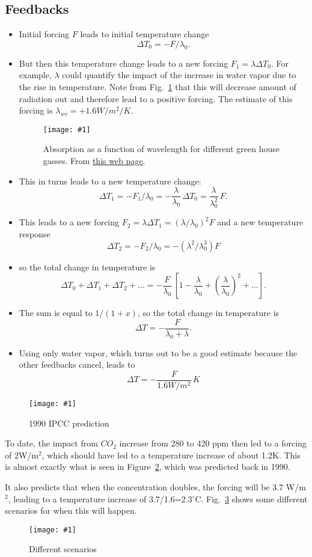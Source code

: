\documentclass[tsecnumarabic,amssymb, nobibnotes, aps, prd]{revtex4-2}
\def\be{\begin{equation}}
\def\ee{\end{equation}}
\newcommand{\sfig}[2]{
\texttt{[image: \#1]}
        }
\newcommand{\Sfig}[2]{
   \begin{figure}[thbp]
   \begin{center}
    \sfig{Figures/#1.pdf}{0.7\columnwidth}
    \caption{{\small #2}}
    \label{fig:#1}
     \end{center}
   \end{figure}
}
\newcommand{\Spng}[2]{
   \begin{figure}[thbp]
   \begin{center}
    \sfig{Figures/#1.png}{0.8\columnwidth}
    \caption{{\small #2}}
    \label{fig:#1}
     \end{center}
   \end{figure}
}
\newcommand{\rf}[1]{\ref{fig:#1}}
\newcommand\bei{\begin{itemize}}
\newcommand\eei{\end{itemize}}
\begin{document}
\subsection{Feedbacks}
\bei
\item Initial forcing $F$ leads to initial temperature change
\be
\Delta T_0 = -F/\lambda_0.\ee
\item But then this temperature change leads to a new forcing $F_1=\lambda \Delta T_0$. For example, $\lambda$ could quantify the impact of the increase in water vapor due to the rise in temperature.  Note from Fig.~\rf{ghg} that this will decrease amount of radiation out and therefore lead to a positive forcing. The estimate of this forcing is $\lambda_{wv}=+1.6 W/m^2/K$.
\Spng{ghg}{Absorption as a function of wavelength for different green house gasses. From \href{https://wattsupwiththat.com/2014/04/11/methane-the-irrelevant-greenhouse-gas/}{this web page}.}
\item This in turns leads to a new temperature change:
\be
\Delta T_1 = -F_1/\lambda_0 = -\frac{\lambda}{\lambda_0}\, \Delta T_0 = \frac{\lambda}{\lambda_0^2}\,F.\ee 
\item This leads to a new forcing $F_2=\lambda \Delta T_1 = (\lambda/\lambda_0)^2 F$ and a new temperature response
\be
\Delta T_2 = -F_2/\lambda_0 = -(\lambda^2/\lambda_0^3) F
\ee
\item so the total change in temperature is
\be
\Delta T_0 + \Delta T_1 + \Delta T_2 + \ldots = -\frac{F}{\lambda_0}\, \left[ 1 - \frac{\lambda}{\lambda_0} + \left( \frac{\lambda}{\lambda_0} \right)^2 + \ldots \right].
\ee
\item The sum is equal to $1/(1+x)$, so the total change in temperature is
\be
\Delta T = -\frac{F}{\lambda_0 + \lambda}.\ee
\item Using only water vapor, which turns out to be a good estimate because the other feedbacks cancel, leads to
\be
\Delta T = -\frac{F}{1.6 W/m^2} \, K\ee
\eei

\Spng{1990}{1990 IPCC prediction}
To date, the impact from $CO_2$ increase from 280 to 420 ppm then led to a forcing of 2W/m$^2$, which should have led to a temperature increase of about 1.2K. This is almost exactly what is seen in Figure~\rf{1990}, which was predicted back in 1990.

It also predicts that when the concentration doubles, the forcing will be 3.7 W/m$^2$, leading to a temperature increase of 3.7/1.6=2.3$^\circ$C. Fig.~\rf{ipcc6fig} shows some different scenarios for when this will happen.

\Sfig{ipcc6fig}{Different scenarios}
\end{document}
